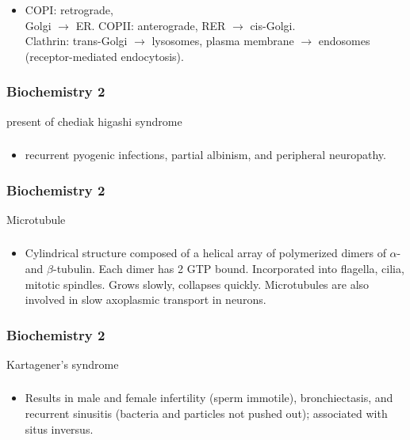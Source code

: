 \documentclass[11pt]{beamer}
\begin{document}
\begin{frame}
 \frametitle{}
\begin{itemize}
\item COPI: retrograde, \\ Golgi ${\rightarrow}$ ER. COPII: anterograde, RER ${\rightarrow}$ cis-Golgi. \\ Clathrin: trans-Golgi ${\rightarrow}$ lysosomes, plasma membrane ${\rightarrow}$ endosomes (receptor-mediated endocytosis).
\end{itemize}
\end{frame}

\begin{frame}
 \frametitle{Biochemistry 2}
present of chediak higashi syndrome 
\end{frame}

\begin{frame}
 \frametitle{}
\begin{itemize}
\item  recurrent pyogenic infections, partial albinism, and peripheral neuropathy.
\end{itemize}
\end{frame}

\begin{frame}
 \frametitle{Biochemistry 2}
Microtubule
\end{frame}

\begin{frame}
 \frametitle{}
\begin{itemize}
\item Cylindrical structure composed of a helical array of polymerized dimers of ${\alpha}$- and ${\beta}$-tubulin. Each dimer has 2 GTP bound. Incorporated into flagella, cilia, mitotic spindles. Grows slowly, collapses quickly. Microtubules are also involved in slow axoplasmic transport in neurons.
\end{itemize}
\end{frame}

\begin{frame}
 \frametitle{Biochemistry 2}
Kartagener’s syndrome
\end{frame}

\begin{frame}
 \frametitle{}
\begin{itemize}
\item Results in male and female infertility (sperm immotile), bronchiectasis, and recurrent sinusitis (bacteria and particles not pushed out); associated with situs inversus.
\end{itemize}
\end{frame}
\end{document}
